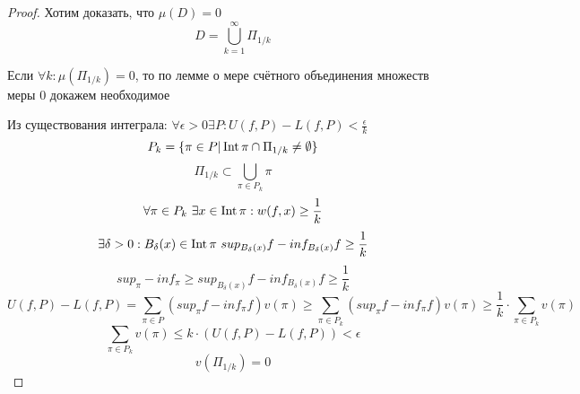 \begin{proof}
        \par Хотим доказать, что $\mu(D) = 0$
        $$D = \bigcup\limits_{k=1}^{\infty} \Pi_{1/k}$$
        \par Если $\forall k: \mu(\Pi_{1/k}) = 0$, то по лемме о мере счётного объединения множеств меры 0 докажем необходимое
        \bigskip
        \par Из существования интеграла: $\forall \epsilon>0 \exists P: U(f, P) - L(f, P) < \frac{\epsilon}{k}$
        $$P_k = \{\pi \in P | \operatorname{Int} \pi \cap \Pi_{1/k} \not = \emptyset \}$$
        $$\Pi_{1/k} \subset \bigcup\limits_{\pi \in P_k} \pi$$
        $$\forall \pi \in P_k \ \exists x \in \operatorname{Int} \pi: w(f, x) \ge \frac{1}{k}$$
        $$\exists \delta > 0: B_{\delta}(x) \in \operatorname{Int}  \pi \ sup_{B_{\delta}(x)} f - inf_{B_{\delta}(x)} f \ge \frac{1}{k}$$
        $$sup_{\pi} - inf_{\pi} \ge sup_{B_{\delta}(x)} f - inf_{B_{\delta}(x)} f \ge\frac{1}{k}$$
        \bigskip
        $$U(f, P) - L(f, P) = \sum\limits_{\pi \in P} (sup_{\pi} f - inf_{\pi} f) v(\pi) \ge \sum\limits_{\pi \in P_k} (sup_{\pi} f - inf_{\pi} f) v(\pi) \ge \frac{1}{k} \cdot \sum\limits_{\pi \in P_k} v(\pi)$$
        $$\sum\limits_{\pi \in P_k} v(\pi) \le k \cdot (U(f, P) - L(f, P)) < \epsilon$$
        \bigskip
        $$v(\Pi_{1/k}) = 0$$ 



    \end{proof}


